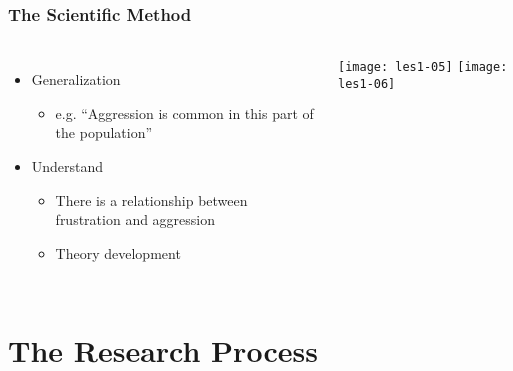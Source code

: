 \documentclass[aspectratio=169]{beamer}
\begin{document}
\begin{frame}
  \frametitle{The Scientific Method}
  
  \begin{columns}[c]
    
    \begin{itemize}
      \item Generalization
      \begin{itemize}
        \item e.g. ``Aggression is common in this part of the population''
      \end{itemize}
      \item Understand
      \begin{itemize}
        \item There is a relationship between frustration and aggression
        \item Theory development
      \end{itemize}
    \end{itemize}
    
    \texttt{[image: les1-05]}
    \vspace*{1cm}
    \texttt{[image: les1-06]}
    
  \end{columns}
\end{frame}

\section{The Research Process}
\end{document}
